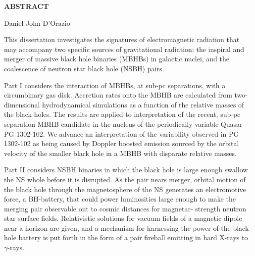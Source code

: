 \thispagestyle{empty}
\begin{center}

{\Large \bf ABSTRACT}

\vspace{.35in}
{\large \bf \thesistitle}

\vspace{.35in}

{\large Daniel John D'Orazio} \\
\vspace{.35in}
\end{center}
%

This dissertation investigates the signatures of electromagnetic radiation
that may accompany two specific sources of gravitational radiation: the
inspiral and merger of massive black hole binaries (MBHBs) in galactic
nuclei, and the coalescence of neutron star black hole (NSBH) pairs. 

Part I considers the interaction of MBHBs, at sub-pc separations, with a
circumbinary gas disk. Accretion rates onto the MBHB are calculated from two-dimensional 
hydrodynamical simulations as a function of the relative masses of
the black holes. The results are applied to interpretation of the recent, sub-pc 
separation MBHB candidate in the nucleus of the periodically variable
Quasar PG 1302-102. We advance an interpretation of the variability observed
in PG 1302-102 as being caused by Doppler boosted emission sourced by the
orbital velocity of the smaller black hole in a MBHB with disparate relative masses.

Part II considers NSBH binaries in which the black hole is large enough
swallow the NS whole before it is disrupted. As the pair nears merger, orbital
motion of the black hole through the magnetosphere of the NS generates an
electromotive force, a BH-battery, that could power luminosities large enough
to make the merging pair observable out to cosmic distances for magnetar-
strength neutron star surface fields. Relativistic solutions for vacuum fields
of a magnetic dipole near a horizon are given, and a mechanism for harnessing
the power of the black-hole battery is put forth in the form of a pair
fireball emitting in hard X-rays to $\gamma$-rays.

